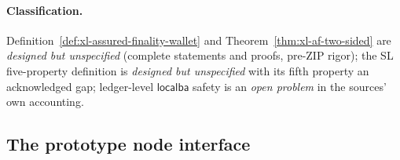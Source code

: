 \documentclass[11pt,a4paper]{article}
\theoremstyle{definition}
\begin{document}
\paragraph{Classification.}
Definition~\ref{def:xl-assured-finality-wallet} and
Theorem~\ref{thm:xl-af-two-sided} are \emph{designed but unspecified}
(complete statements and proofs, pre-ZIP rigor); the SL five-property
definition is \emph{designed but unspecified} with its fifth property an
acknowledged gap; ledger-level $\mathsf{localba}$ safety is an
\emph{open problem} in the sources' own accounting.

\subsection{The prototype node interface}\label{sec:xl-node-interface}
\end{document}
